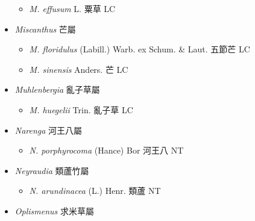 \begin{itemize}
  \begin{itemize}
        \item[] \textit{M. effusum} L.  粟草   LC
  \end{itemize}
 \item[] \textit{Miscanthus} 芒屬
                                
  \begin{itemize}
        \item[] \textit{M. floridulus} (Labill.) Warb. ex Schum. \& Laut.  五節芒   LC
        \item[] \textit{M. sinensis} Anders.  芒   LC
  \end{itemize}
 \item[] \textit{Muhlenbergia} 亂子草屬
                                
  \begin{itemize}
        \item[] \textit{M. huegelii} Trin.  亂子草   LC
  \end{itemize}
 \item[] \textit{Narenga} 河王八屬
                                
  \begin{itemize}
        \item[] \textit{N. porphyrocoma} (Hance) Bor  河王八   NT
  \end{itemize}
 \item[] \textit{Neyraudia} 類蘆竹屬
                                
  \begin{itemize}
        \item[] \textit{N. arundinacea} (L.) Henr.  類蘆   NT
  \end{itemize}
 \item[] \textit{Oplismenus} 求米草屬
                                

\end{itemize}
